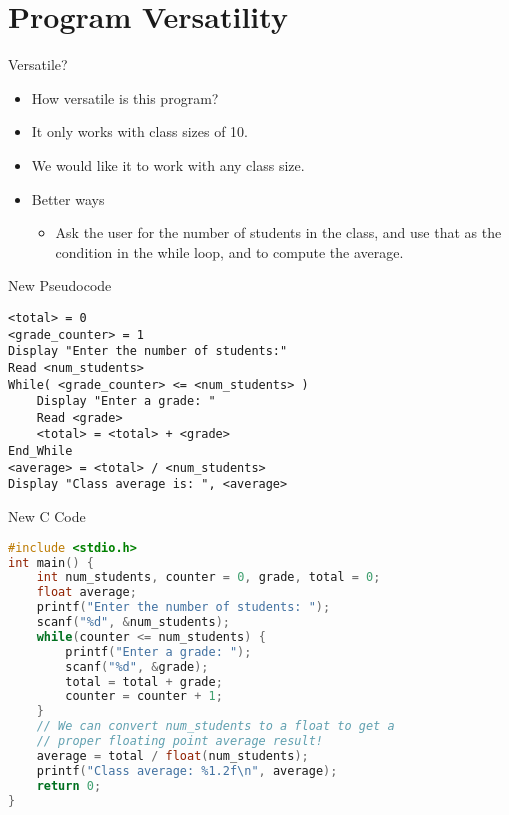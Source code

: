 \documentclass[graphics]{beamer}
\begin{document}
\section*{Program Versatility}
\begin{frame}{Versatile?}
    \begin{itemize}
        \item How versatile is this program?
        \item It only works with class sizes of 10.
        \item We would like it to work with any class size.
        \item Better ways
        \begin{itemize}
            \item Ask the user for the number of students in the class, and use that as the condition in the while loop, and to compute the average.
        \end{itemize}
    \end{itemize}
\end{frame}

\begin{frame}[fragile]{New Pseudocode}
\begin{verbatim}
<total> = 0
<grade_counter> = 1
Display "Enter the number of students:"
Read <num_students>
While( <grade_counter> <= <num_students> )
    Display "Enter a grade: "
    Read <grade>
    <total> = <total> + <grade>
End_While
<average> = <total> / <num_students>
Display "Class average is: ", <average>
\end{verbatim}
\end{frame}

\begin{frame}[fragile]{New C Code}
\begin{lstlisting}[language=C,basicstyle=\footnotesize,keywordstyle=\color{blue},commentstyle=\color{green},showstringspaces=false,stringstyle=\color{red}]
#include <stdio.h>
int main() {
    int num_students, counter = 0, grade, total = 0;
    float average;
    printf("Enter the number of students: ");
    scanf("%d", &num_students);
    while(counter <= num_students) {
        printf("Enter a grade: ");
        scanf("%d", &grade);
        total = total + grade;
        counter = counter + 1;
    }
    // We can convert num_students to a float to get a
    // proper floating point average result!
    average = total / float(num_students);
    printf("Class average: %1.2f\n", average);
    return 0;
}
\end{lstlisting}
\end{frame}
\end{document}
